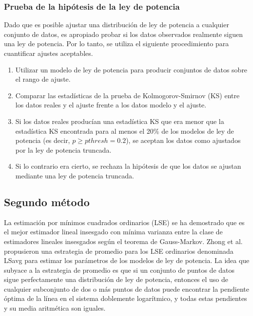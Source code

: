 \subsubsection{ Prueba de la hipótesis de la ley de potencia}\label{sec:ajusteybondad}


Dado que es posible ajustar una distribución de ley de potencia a cualquier conjunto de datos, es apropiado probar si los datos observados realmente siguen una ley de potencia.  Por lo tanto, se utiliza  el siguiente procedimiento para cuantificar ajustes aceptables. 


\begin{procedimiento}
\phantom{text}
\begin{enumerate}
\item Utilizar un modelo de ley de potencia para producir conjuntos de datos sobre el rango de ajuste.
\item Comparar las estadísticas de la prueba de Kolmogorov-Smirnov (KS) entre los datos reales y el ajuste frente a los datos modelo y el ajuste.
\item Si los datos reales producían una estadística KS que era menor que la estadística KS encontrada para al menos el 20\% de los modelos de ley de potencia (es decir, $p \geq pthresh = 0.2$), se aceptan los datos como ajustados por la ley de potencia truncada.
\item Si lo contrario era cierto, se rechaza la hipótesis de que los datos se ajustan mediante una ley de potencia truncada.
\end{enumerate}
\end{procedimiento}

\subsection{Segundo método}

La estimación por mínimos cuadrados ordinarios (LSE) se ha demostrado que es el mejor estimador lineal insesgado con mínima varianza entre la clase de estimadores lineales insesgados según el teorema de Gauss-Markov.  Zhong et al.  \cite{zhong_is_2022} propusieron una estrategia de promedio para los LSE ordinarios denominada LSavg para estimar los parámetros de los modelos de ley de potencia. La idea que subyace a la estrategia de promedio es que si un conjunto de puntos de datos sigue perfectamente una distribución de ley de potencia, entonces el uso de cualquier subconjunto de dos o más puntos de datos puede encontrar la pendiente óptima de la línea en el sistema doblemente logarítmico, y todas estas pendientes y su media aritmética son iguales. 
